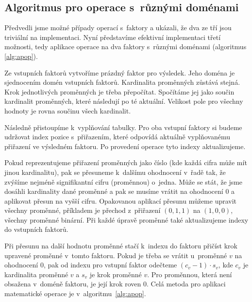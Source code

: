 \subsection{Algoritmus pro operace s~různými doménami}

Předvedli jsme možné případy operací s~faktory a ukázali, že dva ze tří jsou triviální na implementaci.
Nyní představíme efektivní implementaci třetí možnosti, tedy aplikace operace na dva faktory s~různými doménami (algoritmus \ref{alg:apop}).

Ze vstupních faktorů vytvoříme prázdný faktor pro výsledek.
Jeho doména je sjednocením domén vstupních faktorů.
Kardinalita proměnných zůstává stejná.
Krok jednotlivých proměnných je třeba přepočítat.
Spočítáme jej jako součin kardinalit proměnných, které následují po té aktuální.
Velikost pole pro všechny hodnoty je rovna součinu všech kardinalit.

Následně přistoupíme k~vyplňování tabulky.
Pro oba vstupní faktory si budeme udržovat index pozice s~přiřazením, které odpovídá aktuálně vyplňovanému přiřazení ve výsledném faktoru.
Po provedení operace tyto indexy aktualizujeme.

Pokud reprezentujeme přiřazení proměnných jako číslo (kde každá cifra může mít jinou kardinalitu), pak se přesuneme k~dalšímu ohodnocení v~řadě tak, že zvýšíme nejméně signifikantní cifru (proměnnou) o~jedna.
Může se stát, že jsme dosáhli kardinality dané proměnné a pak se musíme vrátit na ohodnocení 0 a aplikovat přesun na vyšší cifru.
Opakovanou aplikací přesunu můžeme upravit všechny proměnné, příkladem je přechod z~přiřazení $(0, 1, 1)$ na $(1, 0, 0)$, všechny proměnné binární.
Při každé úpravě proměnné také aktualizujeme indexy do vstupních faktorů.

Při přesunu na další hodnotu proměnné stačí k~indexu do faktoru přičíst krok upravené proměnné v~tomto faktoru.
Pokud je třeba se vrátit u~proměnné $v$ na ohodnocení 0, pak od indexu pro vstupní faktor odečteme $(c_v - 1) \cdot s_v$, kde $c_v$ je kardinalita proměnné $v$ a $s_v$ je krok proměnné $v$.
Pro proměnnou, která není obsažena v~doméně faktoru, je její krok roven 0.
Celá metoda pro aplikaci matematické operace je v~algoritmu~\ref{alg:apop}.

